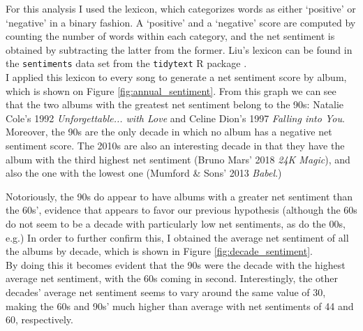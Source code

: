 \documentclass{article}
\begin{document}
For this analysis I used the \cite{Liu_sentiments} lexicon, which categorizes words as either `positive' or `negative' in a binary fashion. A `positive' and a `negative' score are computed by counting the number of words within each category, and the net sentiment is obtained by subtracting the latter from the former. Liu's lexicon can be found in the \texttt{sentiments} data set from the \texttt{tidytext} \textsf{R} package \citep{text_mining_r}. \\



I applied this lexicon to every song to generate a net sentiment score by album, which is shown on Figure \ref{fig:annual_sentiment}. From this graph we can see that the two albums with the greatest net sentiment belong to the 90s: Natalie Cole's 1992 \textit{Unforgettable... with Love} and Celine Dion's 1997 \textit{Falling into You}. Moreover, the 90s are the only decade in which no album has a negative net sentiment score. The 2010s are also an interesting decade in that they have the album with the third highest net sentiment (Bruno Mars' 2018 \textit{24K Magic}), and also the one with the lowest one (Mumford \& Sons' 2013 \textit{Babel}.)



Notoriously, the 90s do appear to have albums with a greater net sentiment than the 60s', evidence that appears to favor our previous hypothesis (although the 60s do not seem to be a decade with particularly low net sentiments, as do the 00s, e.g.) In order to further confirm this, I obtained the average net sentiment of all the albums by decade, which is shown in Figure \ref{fig:decade_sentiment}. \\

By doing this it becomes evident that the 90s were the decade with the highest average net sentiment, with the 60s coming in second. Interestingly, the other decades' average net sentiment seems to vary around the same value of 30, making the 60s and 90s' much higher than average with net sentiments of 44 and 60, respectively.
\end{document}
